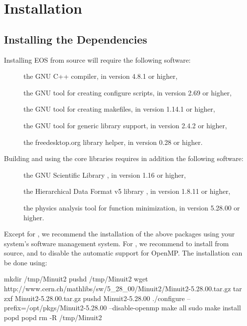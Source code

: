 \chapter{Installation}

\section{Installing the Dependencies}

Installing EOS from source will require the following software:
\begin{description}
    \item[] the GNU C++ compiler, in version 4.8.1 or higher,
    \item[] the GNU tool for creating configure scripts, in version 2.69 or higher,
    \item[] the GNU tool for creating makefiles, in version 1.14.1 or higher,
    \item[] the GNU tool for generic library support, in version 2.4.2 or higher,
    \item[] the freedesktop.org library helper, in version 0.28 or higher.
\end{description}
%
Building and using the core libraries requires in addition the following software:
\begin{description}
    \item[] the GNU Scientific Library \cite{GSL}, in version 1.16 or higher,
    \item[] the Hierarchical Data Format v5 library \cite{HDF5}, in version 1.8.11 or higher,
    \item[] the physics analysis tool for function minimization, in version 5.28.00 or higher.
\end{description}
Except for , we recommend the installation of the above packages using your system's
software management system. For , we recommend to install from source, and to disable
the automatic support for OpenMP. The installation can be done using:
\begin{commandline}
mkdir /tmp/Minuit2
pushd /tmp/Minuit2
wget http://www.cern.ch/mathlibs/sw/5_28_00/Minuit2/Minuit2-5.28.00.tar.gz
tar zxf Minuit2-5.28.00.tar.gz
pushd Minuit2-5.28.00
./configure --prefix=/opt/pkgs/Minuit2-5.28.00 --disable-openmp
make all
sudo make install
popd
popd
rm -R /tmp/Minuit2
\end{commandline}

